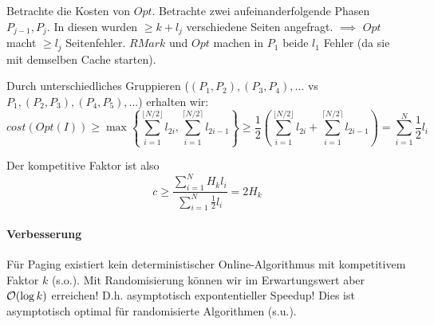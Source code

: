 Betrachte die Kosten von $Opt$.
Betrachte zwei aufeinanderfolgende Phasen $P_{j-1}, P_j$.
In diesen wurden $\geq k+l_j$ verschiedene Seiten angefragt.
$\implies$ $Opt$ macht $\geq l_j$ Seitenfehler.
$RMark$ und $Opt$ machen in $P_1$ beide $l_1$ Fehler (da sie mit demselben Cache starten).

Durch unterschiedliches Gruppieren ($(P_1, P_2), (P_3, P_4), ...$ vs $P_1, (P_2, P_3), (P_4, P_5), ...$)
erhalten wir:
$$ cost(Opt(I))
    \geq \max \left\{ \sum_{i=1}^{ \lfloor N/2 \rfloor } l_{2i} , \sum_{i=1}^{ \lceil N/2 \rceil } l_{2i-1} \right\}
    \geq \frac{1}{2} \left( \sum_{i=1}^{ \lfloor N/2 \rfloor } l_{2i} + \sum_{i=1}^{ \lceil N/2 \rceil } l_{2i-1} \right)
    = \sum_{i=1}^{N} \frac{1}{2} l_i
$$

Der kompetitive Faktor ist also
$$ c \geq \dfrac{ \sum_{i=1}^{N} H_k l_i }{ \sum_{i=1}^{N} \frac{1}{2} l_i } = 2 H_k $$

\paragraph{Verbesserung}
Für Paging existiert kein deterministischer Online-Algorithmus mit kompetitivem Faktor $k$ (s.o.).
Mit Randomisierung können wir im Erwartungswert aber $\mathcal{O}(\log k)$ erreichen!
D.h. asymptotisch expontentieller Speedup!
Dies ist asymptotisch optimal für randomisierte Algorithmen (s.u.).
